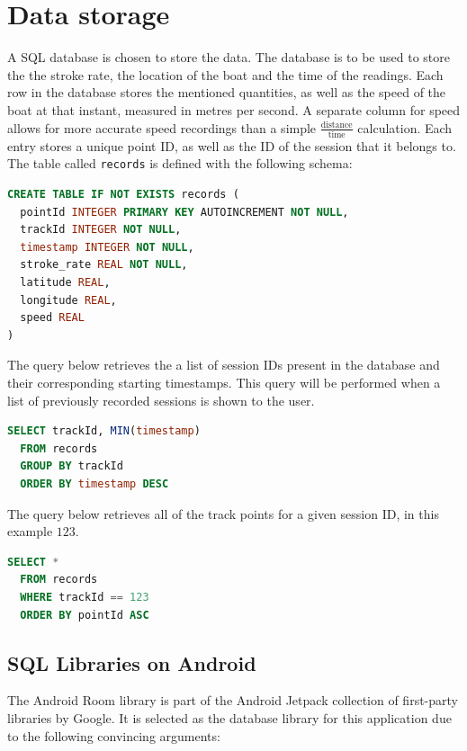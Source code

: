 \documentclass[11pt,twoside,a4paper]{report}
\begin{document}
\section{Data storage}

A SQL database is chosen to store the data. The database is to be used to store the the stroke rate, the location of the boat and the time of the readings. Each row in the database stores the mentioned quantities, as well as the speed of the boat at that instant, measured in metres per second. A separate column for speed allows for more accurate speed recordings than a simple $\frac{\text{distance}}{\text{time}}$ calculation. Each entry stores a unique point ID, as well as the ID of the session that it belongs to. The table called \texttt{records} is defined with the following schema:

\begin{lstlisting}[language=sql]
CREATE TABLE IF NOT EXISTS records (
  pointId INTEGER PRIMARY KEY AUTOINCREMENT NOT NULL,
  trackId INTEGER NOT NULL, 
  timestamp INTEGER NOT NULL, 
  stroke_rate REAL NOT NULL, 
  latitude REAL, 
  longitude REAL, 
  speed REAL
)
\end{lstlisting}

The query below retrieves the a list of session IDs present in the database and their corresponding starting timestamps. This query will be performed when a list of previously recorded sessions is shown to the user.
\begin{lstlisting}[language=sql]
  SELECT trackId, MIN(timestamp) 
  FROM records 
  GROUP BY trackId 
  ORDER BY timestamp DESC
\end{lstlisting}

The query below retrieves all of the track points for a given session ID, in this example $123$.
\begin{lstlisting}[language=sql]
  SELECT * 
  FROM records 
  WHERE trackId == 123 
  ORDER BY pointId ASC
\end{lstlisting}

\subsection{SQL Libraries on Android}

The Android Room library is part of the Android Jetpack collection of first-party libraries by Google. It is selected as the database library for this application due to the following convincing arguments:
\end{document}
